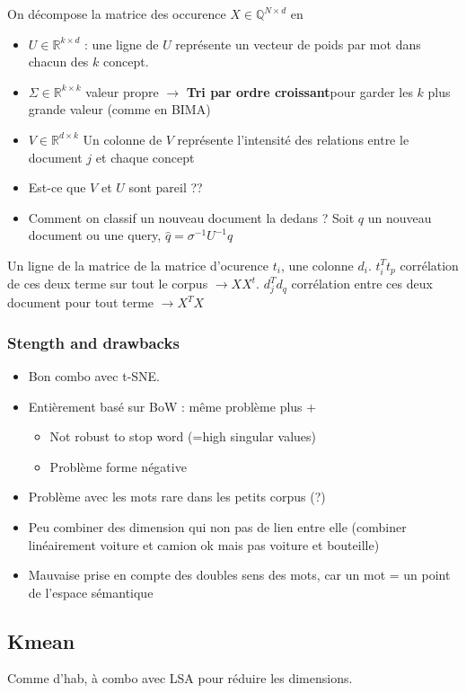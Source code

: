 \documentclass{article}
\theoremstyle{plain}%
\theoremstyle{definition}
\theoremstyle{remark}
\begin{document}
On décompose la matrice des occurence $ X \in \mathbb{Q}^{N \times d}$ en \begin{itemize}
    \item $ U \in \mathbb{R}^{k \times d} $ : une ligne de $ U $ représente un vecteur de poids par mot dans chacun des $ k $ concept.
    \item $ \Sigma \in \mathbb{R}^{k \times k} $ valeur propre $\rightarrow$ \textbf{Tri par ordre croissant}pour garder les $k$ plus grande valeur (comme en BIMA)
    \item $ V \in \mathbb{R}^{d \times k} $ Un colonne de $ V $ représente l'intensité des relations entre le document $j$ et chaque concept
    \item Est-ce que $ V $ et $ U $ sont pareil ?? 
    \item Comment on classif un nouveau document la dedans ? Soit $ q $ un nouveau document ou une query, $ \hat{q} = \sigma ^{-1} U^{-1} q $ 
\end{itemize}
Un ligne de la matrice de la matrice d'ocurence $ t_i $, une colonne $ d_i $. $ t_i^T t_p $ corrélation de ces deux terme sur tout le corpus $\rightarrow X X^t$. $ d_j^T d_q $ corrélation entre ces deux document pour tout terme $\rightarrow X^T X$

\subsubsection{Stength and drawbacks}
\begin{itemize}
    \item Bon combo avec t-SNE.
    \item Entièrement basé sur BoW : même problème  plus +\begin{itemize}
        \item Not robust to stop word (=high singular values)
        \item Problème forme négative 
    \end{itemize}
    \item Problème avec les mots rare dans les petits corpus (?)
    \item Peu combiner des dimension qui non pas de lien entre elle (combiner linéairement voiture et camion ok mais pas voiture et bouteille)
    \item Mauvaise prise en compte des doubles sens des mots, car un mot = un point de l'espace sémantique
\end{itemize}

\subsection{Kmean}
Comme d'hab, à combo avec LSA pour réduire les dimensions. 
\end{document}

